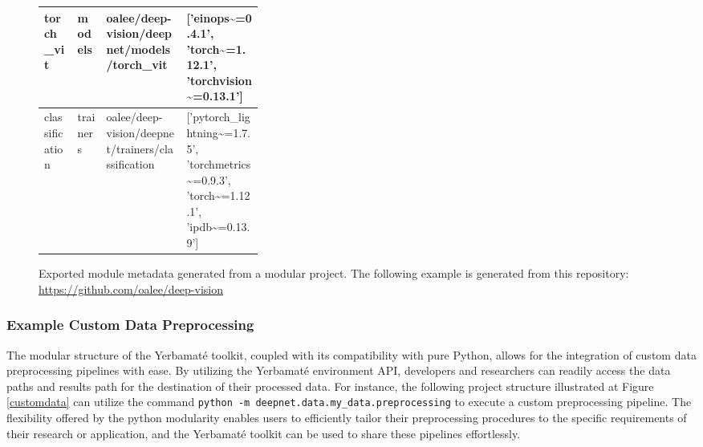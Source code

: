 \begin{figure}[H]
\begin{tabular}{|l|l|l|p{0.35\linewidth}|}
  \hline 
 torch\_vit      & models      & oalee/deep-vision/deepnet/models/torch\_vit         & ['einops\textasciitilde{}=0.4.1', 'torch\textasciitilde{}=1.12.1', 'torchvision\textasciitilde{}=0.13.1']                                                                                                                                                                                                                                                                                    \\
  \hline 
 classification & trainers    & oalee/deep-vision/deepnet/trainers/classification  & ['pytorch\_lightning\textasciitilde{}=1.7.5', 'torchmetrics\textasciitilde{}=0.9.3', 'torch\textasciitilde{}=1.12.1', 'ipdb\textasciitilde{}=0.13.9']                                                                                                                                                                                                                                                         \\
\hline

\end{tabular}
   
\caption{Exported module metadata generated from a modular project. The following example is generated from this repository: \url{https://github.com/oalee/deep-vision} }
    \label{fig:my_label}
\end{figure}


\subsubsection{Example Custom Data Preprocessing}
The modular structure of the Yerbamaté toolkit, coupled with its compatibility with pure Python, allows for the integration of custom data preprocessing pipelines with ease. By utilizing the Yerbamaté environment API, developers and researchers can readily access the data paths and results path for the destination of their processed data. For instance, the following project structure illustrated at Figure \ref{customdata} can utilize the command \texttt{python -m deepnet.data.my\_data.preprocessing} to execute a custom preprocessing pipeline. The flexibility offered by the python modularity enables users to efficiently tailor their preprocessing procedures to the specific requirements of their research or application, and the Yerbamaté toolkit can be used to share these pipelines effortlessly.


